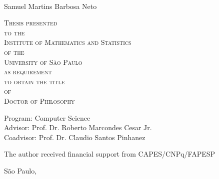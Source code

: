 \documentclass[11pt,twoside,a4paper]{book}
\begin{document}
\hypersetup{pageanchor=false}
\frontmatter
\fancyhead[RO]{{\footnotesize\rightmark}\hspace{2em}\thepage}
\setcounter{tocdepth}{2}
\fancyhead[LE]{\thepage\hspace{2em}\footnotesize{\leftmark}}
\fancyhead[RE,LO]{}
\fancyhead[RO]{{\footnotesize\rightmark}\hspace{2em}\thepage}

\onehalfspacing  %

\thispagestyle{empty}
\begin{center}
    \vspace*{2.3cm}
    \textbf{\Large{\phdTitle}}\\
    
    \vspace*{1.2cm}
    \Large{Samuel Martins Barbosa Neto}
    
    \vskip 2cm
    \textsc{
    Thesis presented\\[-0.25cm] 
    to the\\[-0.25cm]
    Institute of Mathematics and Statistics\\[-0.25cm]
    of the\\[-0.25cm]
    University of São Paulo\\[-0.25cm]
    as requirement\\[-0.25cm]
    to obtain the title\\[-0.25cm]
    of\\[-0.25cm]
    Doctor of Philosophy}
    
    \vskip 1.5cm
    Program: Computer Science\\
    Advisor: Prof. Dr. Roberto Marcondes Cesar Jr.\\
    Coadvisor: Prof. Dr. Claudio Santos Pinhanez

       \vskip 1cm
    \normalsize{The author received financial support from CAPES/CNPq/FAPESP}
    
    \vskip 0.5cm
    \normalsize{São Paulo, \finalMonth~\thesisYear}
\end{center}

%
%
%
\newpage
\thispagestyle{empty}
    \begin{center}
        \vspace*{2.3 cm}
        \textbf{\Large{\phdTitle}}\\
        \vspace*{2 cm}
    \end{center}
\end{document}
